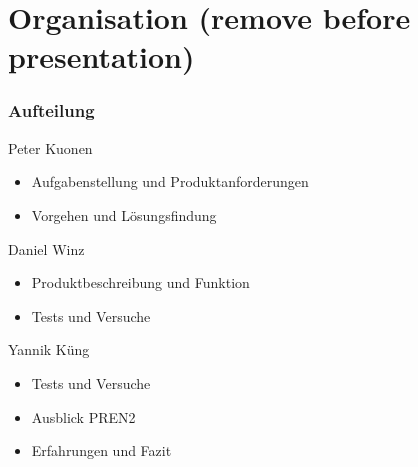 \section{Organisation (remove before presentation)}
\begin{frame}
    \frametitle{Aufteilung}
    \begin{block}{Peter Kuonen}
        \begin{itemize}
            \item Aufgabenstellung und Produktanforderungen
            \item Vorgehen und Lösungsfindung
        \end{itemize}
    \end{block}
    \begin{block}{Daniel Winz}
        \begin{itemize}
            \item Produktbeschreibung und Funktion
            \item Tests und Versuche
        \end{itemize}
    \end{block}
    \begin{block}{Yannik Küng}
        \begin{itemize}
            \item Tests und Versuche
            \item Ausblick PREN2
            \item Erfahrungen und Fazit
        \end{itemize}
    \end{block}
\end{frame}

